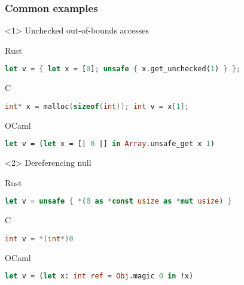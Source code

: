 \begin{frame}[fragile, t]
    \frametitle{Common examples}

    \begin{onlyenv}<1>
        Unchecked out-of-bounds accesses
        \begin{block}{Rust}
            \begin{lstlisting}[language=rust]
let v = { let x = [0]; unsafe { x.get_unchecked(1) } };
            \end{lstlisting}
        \end{block}

        \begin{block}{C}
            \begin{lstlisting}[language=c]
int* x = malloc(sizeof(int)); int v = x[1];
            \end{lstlisting}
        \end{block}

        \begin{block}{OCaml}
            \begin{lstlisting}[language=ml]
let v = (let x = [| 0 |] in Array.unsafe_get x 1)
            \end{lstlisting}
        \end{block}
    \end{onlyenv}

    \begin{onlyenv}<2>
        Dereferencing null
        \begin{block}{Rust}
            \begin{lstlisting}[language=rust]
let v = unsafe { *(0 as *const usize as *mut usize) }
            \end{lstlisting}
        \end{block}

        \begin{block}{C}
            \begin{lstlisting}[language=c]
int v = *(int*)0
            \end{lstlisting}
        \end{block}

        \begin{block}{OCaml}
            \begin{lstlisting}[language=ml]
let v = (let x: int ref = Obj.magic 0 in !x)
            \end{lstlisting}
        \end{block}
    \end{onlyenv}


\end{frame}
